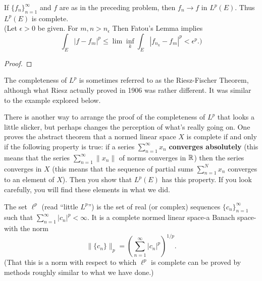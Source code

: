\begin{pblm}%
	If $\{f_n\}_{n=1}^\infty$ and $f$ are as in the preceding problem, then $f_n \rightarrow f$ in 
	$L^p(E)$. Thus $L^p(E)$ is complete.\\
	{\scriptsize{(Let $\epsilon > 0$ be given. For $m,n > n_\epsilon$ Then Fatou's Lemma implies 
	\begin{equation*}
		\int_E|f-f_m|^p \le \lim\inf\limits_{k}\int_E|f_{n_k} - f_m|^p < \epsilon^p.)
	\end{equation*}
	}}
\begin{proof}
\end{proof}
\end{pblm}

\begin{rmk}%
	The completeness of $L^p$ is sometimes referred to as the Riesz-Fischer Theorem, although 
	what Riesz actually proved in 1906 was rather different. It was similar to the example 
	explored below. 
\end{rmk}

\begin{rmk}%
	There is another way to arrange the proof of the completeness of $L^p$ that looks a little 
	slicker, but perhaps changes the perception of what's really going on. One proves the abstract 
	theorem that a normed linear space $X$ is complete if and only if the following property is 
	true: if a series $\sum\limits_{n=1}^\infty x_n$ \textbf{converges absolutely} (this means 
	that the series $\sum\limits_{n=1}^\infty \|x_n\|$ of norms converges in $\mathbb{R}$) then the series 
	converges in $X$ (this means that the sequence of partial sums $\sum\limits_{n=1}^N x_n$ 
	converges to an element of $X$). Then you show that $L^p(E)$ has this property. If you look 
	carefully, you will find these elements in what we did.
\end{rmk}

\begin{defn}%
	The set $\ell^p$ (read ``little $L^p$'') is the set of real (or complex) sequences $\{c_n\}_{n=1}^\infty$ 
	such that $\sum\limits_{n=1}^\infty |c_n|^p < \infty$. It is a complete normed linear space-a 
	Banach space-with the norm 
	\begin{equation*}
		\|\{c_n\}\|_p = \left(\sum\limits_{n=1}^\infty |c_n|^p\right)^{1/p}. 
	\end{equation*}
	(That this is a norm with respect to which $\ell^p$ is complete can be proved by methods 
	roughly similar to what we have done.)
\end{defn}

